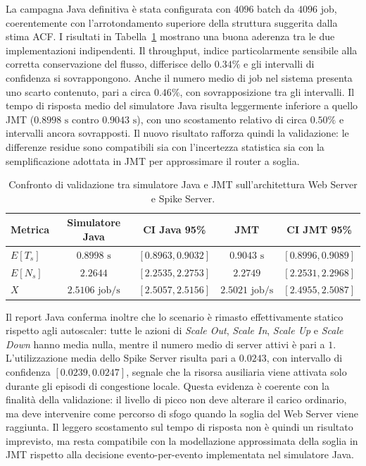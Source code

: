 ﻿\documentclass[a4paper,12pt]{article}
\begin{document}
La campagna Java definitiva è stata configurata con $4096$ batch da $4096$ job, coerentemente con l'arrotondamento superiore della struttura suggerita dalla stima ACF. I risultati in Tabella~\ref{tab:validation_system_comparison} mostrano una buona aderenza tra le due implementazioni indipendenti. Il throughput, indice particolarmente sensibile alla corretta conservazione del flusso, differisce dello $0.34\%$ e gli intervalli di confidenza si sovrappongono. Anche il numero medio di job nel sistema presenta uno scarto contenuto, pari a circa $0.46\%$, con sovrapposizione tra gli intervalli. Il tempo di risposta medio del simulatore Java risulta leggermente inferiore a quello JMT ($0.8998\text{ s}$ contro $0.9043\text{ s}$), con uno scostamento relativo di circa $0.50\%$ e intervalli ancora sovrapposti. Il nuovo risultato rafforza quindi la validazione: le differenze residue sono compatibili sia con l'incertezza statistica sia con la semplificazione adottata in JMT per approssimare il router a soglia.

\begin{table}[h]
    \centering
    \small
    \renewcommand{\arraystretch}{1.3}
    \begin{tabular}{lcccc}
        \hline
        \textbf{Metrica} & \textbf{Simulatore Java} & \textbf{CI Java 95\%} & \textbf{JMT} & \textbf{CI JMT 95\%} \\ \hline
        $E[T_s]$         & $0.8998\text{ s}$        & $[0.8963, 0.9032]$    & $0.9043\text{ s}$ & $[0.8996, 0.9089]$ \\
        $E[N_s]$         & $2.2644$                 & $[2.2535, 2.2753]$    & $2.2749$          & $[2.2531, 2.2968]$ \\
        $X$              & $2.5106\text{ job/s}$    & $[2.5057, 2.5156]$    & $2.5021\text{ job/s}$ & $[2.4955, 2.5087]$ \\ \hline
    \end{tabular}
    \caption{Confronto di validazione tra simulatore Java e JMT sull'architettura Web Server e Spike Server.}
    \label{tab:validation_system_comparison}
\end{table}

Il report Java conferma inoltre che lo scenario è rimasto effettivamente statico rispetto agli autoscaler: tutte le azioni di \textit{Scale Out}, \textit{Scale In}, \textit{Scale Up} e \textit{Scale Down} hanno media nulla, mentre il numero medio di server attivi è pari a $1$. L'utilizzazione media dello Spike Server risulta pari a $0.0243$, con intervallo di confidenza $[0.0239,0.0247]$, segnale che la risorsa ausiliaria viene attivata solo durante gli episodi di congestione locale. Questa evidenza è coerente con la finalità della validazione: il livello di picco non deve alterare il carico ordinario, ma deve intervenire come percorso di sfogo quando la soglia del Web Server viene raggiunta. Il leggero scostamento sul tempo di risposta non è quindi un risultato imprevisto, ma resta compatibile con la modellazione approssimata della soglia in JMT rispetto alla decisione evento-per-evento implementata nel simulatore Java.
\end{document}
